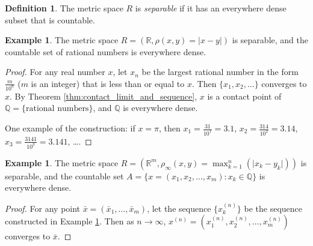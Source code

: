 \documentclass[a4paper,12pt]{article}
\newcommand{\realR}{\mathbb{R}}
\newcommand{\ratQ}{\mathbb{Q}}
\theoremstyle{definition}
\newtheorem{defn}[thm]{Definition}
\newtheorem{expl}[thm]{Example}
\theoremstyle{remark}
\begin{document}
\begin{defn}
  The metric space $R$ is \emph{separable} if it has an everywhere dense subset that is countable.
\end{defn}

\begin{expl} \label{expl:R_is_separable}
  The metric space $R = (\realR, \rho(x, y) = \lvert x - y \rvert)$ is separable, and the countable set of rational numbers is everywhere dense.
\end{expl}
\begin{proof}
  For any real number $x$, let $x_n$ be the largest rational number in the form $\frac{m}{10^n}$ ($m$ is an integer) that is less than or equal to $x$. Then $\{ x_1, x_2, \dotsc \}$ converges to $x$. By Theorem \ref{thm:contact_limit_and_sequence}, $x$ is a contact point of $\ratQ = \{ \text{rational numbers} \}$, and $\ratQ$ is everywhere dense.

  One example of the construction: if $x = \pi$, then $x_1 = \frac{31}{10^1} = 3.1$, $x_2 = \frac{314}{10^2} = 3.14$, $x_3 = \frac{3141}{10^3} = 3.141$, \dots.
\end{proof}

\begin{expl}
  The metric space $R = (\realR^m, \rho_{\infty}(x, y) = \max^n_{k=1}( \lvert x_k - y_k \rvert ))$ is separable, and the countable set $A = \{ x = (x_1, x_2, \dotsc, x_m) : x_k \in \ratQ \}$ is everywhere dense. 
\end{expl}
\begin{proof}
  For any point $\bar{x} = (\bar{x}_1, \dotsc, \bar{x}_m)$, let the sequence $\{ x^{(n)}_k \}$ be the sequence constructed in Example \ref{expl:R_is_separable}. Then as $n \to \infty$, $x^{(n)} = (x^{(n)}_1, x^{(n)}_2, \dotsc, x^{(n)}_m)$ converges to $\bar{x}$.
\end{proof}
\end{document}
